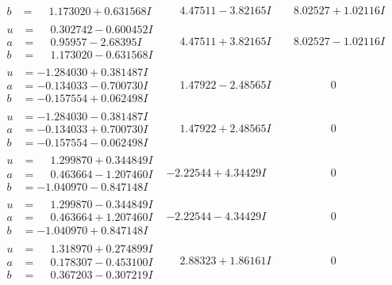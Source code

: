 \documentclass[1p]{elsarticle_modified}
\theoremstyle{definition}
\begin{document}
$$\begin{array}{c|c|c}
\begin{aligned}
b &= \phantom{-}1.173020 + 0.631568 I\end{aligned}
 & \phantom{-}4.47511 - 3.82165 I & \phantom{-}8.02527 + 1.02116 I \\ \hline\begin{aligned}
u &= \phantom{-}0.302742 - 0.600452 I \\
a &= \phantom{-}0.95957 - 2.68395 I \\
b &= \phantom{-}1.173020 - 0.631568 I\end{aligned}
 & \phantom{-}4.47511 + 3.82165 I & \phantom{-}8.02527 - 1.02116 I \\ \hline\begin{aligned}
u &= -1.284030 + 0.381487 I \\
a &= -0.134033 - 0.700730 I \\
b &= -0.157554 + 0.062498 I\end{aligned}
 & \phantom{-}1.47922 - 2.48565 I & \phantom{-0.000000 } 0 \\ \hline\begin{aligned}
u &= -1.284030 - 0.381487 I \\
a &= -0.134033 + 0.700730 I \\
b &= -0.157554 - 0.062498 I\end{aligned}
 & \phantom{-}1.47922 + 2.48565 I & \phantom{-0.000000 } 0 \\ \hline\begin{aligned}
u &= \phantom{-}1.299870 + 0.344849 I \\
a &= \phantom{-}0.463664 - 1.207460 I \\
b &= -1.040970 - 0.847148 I\end{aligned}
 & -2.22544 + 4.34429 I & \phantom{-0.000000 } 0 \\ \hline\begin{aligned}
u &= \phantom{-}1.299870 - 0.344849 I \\
a &= \phantom{-}0.463664 + 1.207460 I \\
b &= -1.040970 + 0.847148 I\end{aligned}
 & -2.22544 - 4.34429 I & \phantom{-0.000000 } 0 \\ \hline\begin{aligned}
u &= \phantom{-}1.318970 + 0.274899 I \\
a &= \phantom{-}0.178307 - 0.453100 I \\
b &= \phantom{-}0.367203 - 0.307219 I\end{aligned}
 & \phantom{-}2.88323 + 1.86161 I & \phantom{-0.000000 } 0 \\ \hline\begin{aligned}

\end{aligned}
\end{array}$$
\end{document}
